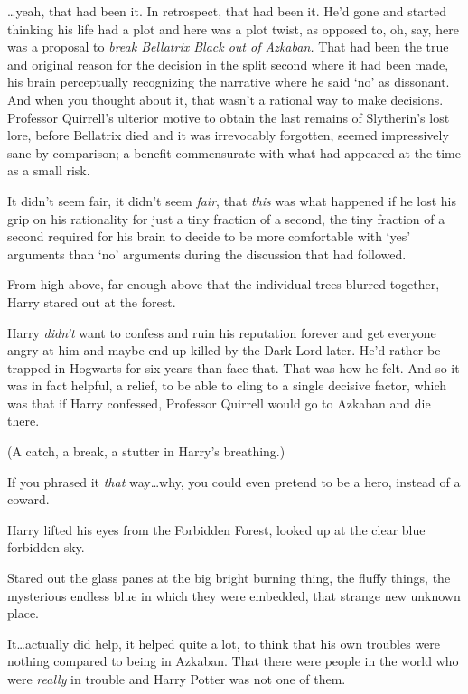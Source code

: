 …yeah, that had been it. In retrospect, that had been it. He'd gone and
started thinking his life had a plot and here was a plot twist, as opposed to,
oh, say, here was a proposal to \emph{break Bellatrix Black out of Azkaban.}
That had been the true and original reason for the decision in the split second
where it had been made, his brain perceptually recognizing the narrative where
he said `no' as dissonant. And when you thought about it, that wasn't a
rational way to make decisions. Professor Quirrell's ulterior motive to obtain
the last remains of Slytherin's lost lore, before Bellatrix died and it was
irrevocably forgotten, seemed impressively sane by comparison; a benefit
commensurate with what had appeared at the time as a small risk.

It didn't seem fair, it didn't seem \emph{fair}, that \emph{this} was what
happened if he lost his grip on his rationality for just a tiny fraction of a
second, the tiny fraction of a second required for his brain to decide to be
more comfortable with `yes' arguments than `no' arguments during the discussion
that had followed.

From high above, far enough above that the individual trees blurred together,
Harry stared out at the forest.

Harry \emph{didn't} want to confess and ruin his reputation forever and get
everyone angry at him and maybe end up killed by the Dark Lord later. He'd
rather be trapped in Hogwarts for six years than face that. That was how he
felt. And so it was in fact helpful, a relief, to be able to cling to a single
decisive factor, which was that if Harry confessed, Professor Quirrell would go
to Azkaban and die there.

(A catch, a break, a stutter in Harry's breathing.)

If you phrased it \emph{that} way…why, you could even pretend to be a
hero, instead of a coward.

Harry lifted his eyes from the Forbidden Forest, looked up at the clear blue
forbidden sky.

Stared out the glass panes at the big bright burning thing, the fluffy things,
the mysterious endless blue in which they were embedded, that strange new
unknown place.

It…actually did help, it helped quite a lot, to think that his own
troubles were nothing compared to being in Azkaban. That there were people in
the world who were \emph{really} in trouble and Harry Potter was not one of
them.

